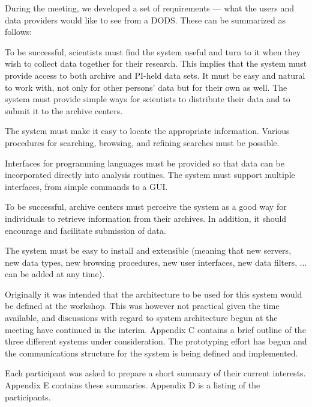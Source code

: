 During the meeting, we developed a set of requirements --- what the
users and data providers would like to see from a DODS. These can be
summarized as follows:

\begin{list}{--}{}

\item To be successful, scientists must find the system useful and turn
to it when they wish to collect data together for their research. This
implies that the system must provide access to both archive and PI-held
data sets. It must be easy and natural to work with, not only for
other persons' data but for their own as well. The system must provide
simple ways for scientists to distribute their data and to submit it
to the archive centers.

\item The system must make it easy to locate the appropriate information.
Various procedures for searching, browsing, and refining searches must
be possible.

\item Interfaces for programming languages must be provided so that
data can be incorporated directly into analysis routines. The system
must support multiple interfaces, from simple commands to a GUI.

\item To be successful, archive centers must perceive the system as a
good way for individuals to retrieve information from their archives.
In addition, it should encourage and facilitate submission of data.

\item The system must be easy to install and extensible (meaning that new
servers, new data types, new browsing procedures, new user interfaces,
new data filters, ... can be added at any time).

\end{list}

Originally it was intended that the architecture to be used for this
system would be defined at the workshop. This was however
not practical given the time available, and discussions with regard to 
system architecture begun at the meeting have continued in the 
interim. Appendix C contains a brief outline of the three different 
systems under consideration. The prototyping effort has begun and the
communications structure for the system is being defined and
implemented.

Each participant was asked to prepare a short summary of their current 
interests. Appendix E contains these summaries. Appendix D is a 
listing of the participants.

